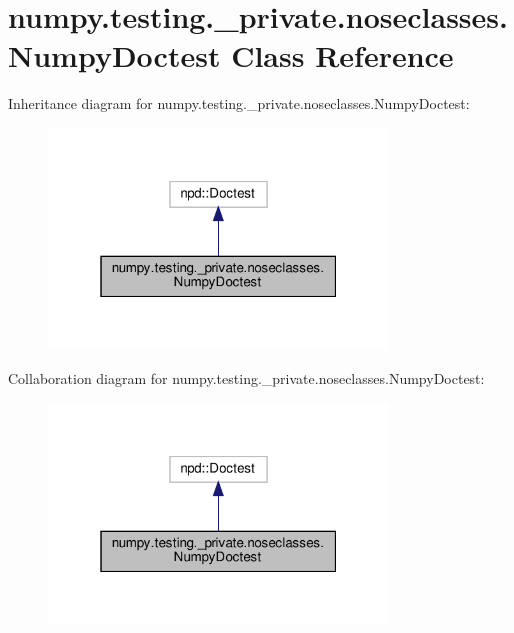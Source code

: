 \hypertarget{classnumpy_1_1testing_1_1__private_1_1noseclasses_1_1NumpyDoctest}{}\section{numpy.\+testing.\+\_\+private.\+noseclasses.\+Numpy\+Doctest Class Reference}
\label{classnumpy_1_1testing_1_1__private_1_1noseclasses_1_1NumpyDoctest}


Inheritance diagram for numpy.\+testing.\+\_\+private.\+noseclasses.\+Numpy\+Doctest\+:
\nopagebreak
\begin{figure}[H]
\begin{center}
\leavevmode
\includegraphics[width=256pt]{classnumpy_1_1testing_1_1__private_1_1noseclasses_1_1NumpyDoctest__inherit__graph}
\end{center}
\end{figure}


Collaboration diagram for numpy.\+testing.\+\_\+private.\+noseclasses.\+Numpy\+Doctest\+:
\nopagebreak
\begin{figure}[H]
\begin{center}
\leavevmode
\includegraphics[width=256pt]{classnumpy_1_1testing_1_1__private_1_1noseclasses_1_1NumpyDoctest__coll__graph}
\end{center}
\end{figure}
